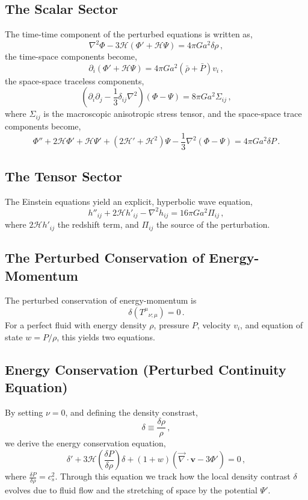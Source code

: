 \documentclass{book}
\begin{document}
	\subsection*{The Scalar Sector}
	The time-time component of the perturbed equations is written as,
	\begin{equation}
		\label{time-time_component_perturbation}
		\nabla^2 \Phi - 3 \mathcal{H}(\Phi ' +\mathcal{H}\Psi)=4\pi Ga^2\delta \rho \, ,
	\end{equation}
	the time-space components become,
	\begin{equation}
		\partial_i (\Phi'+\mathcal{H}\Psi)=4\pi Ga^2 (\bar\rho+\bar P)v_i \, ,
	\end{equation}
	the space-space traceless components,
	\begin{equation}
		\left( \partial_i \partial_j -\frac13 \delta_{ij}\nabla^2 \right)(\Phi-\Psi)=8\pi Ga^2\Sigma_{ij} \, ,
	\end{equation}
	where $\Sigma_{ij}$ is the macroscopic anisotropic stress tensor, and the space-space trace components become,
	\begin{equation}
		\Phi '' +2\mathcal{H} \Phi'+\mathcal{H} \Psi' + (2\mathcal{H}'+\mathcal{H}^2)\Psi -\frac13 \nabla^2 (\Phi-\Psi)=4\pi Ga^2 \delta P \, .
	\end{equation}
	\subsection*{The Tensor Sector}
	The Einstein equations yield an explicit, hyperbolic wave equation,
	\begin{equation}
		h''_{ij}+2\mathcal{H}h'_{ij}-\nabla^2h_{ij}=16\pi Ga^2 \Pi_{ij} \, ,
	\end{equation}
	where $2\mathcal{H}h'_{ij}$ the redshift term, and $\Pi_{ij}$ the source of the perturbation.
	\subsection{The Perturbed Conservation of Energy-Momentum}
	The perturbed conservation of energy-momentum is
	\begin{equation}
		\delta\left( {T^\mu}_{\nu;\mu} \right) =0 \, .
	\end{equation}
	For a perfect fluid with energy density $\rho$, pressure $P$, velocity $v_i$, and equation of state $w=P/\rho$, this yields two equations.
	\subsection*{Energy Conservation (Perturbed Continuity Equation)}
	By setting $\nu=0$, and defining the density constrast,
	\begin{equation}
		\delta\equiv\frac{\delta\rho}{\rho}\, ,
	\end{equation}
	we derive the energy conservation equation,
	\begin{equation}
		\delta'+3\mathcal{H} \left( \frac{\delta P}{\delta \rho} \right) \delta + (1+w)(\vec\nabla\cdot \mathbf{v}-3\Phi') =0 \, ,
	\end{equation}
	where $\frac{\delta P}{\delta\rho}=c^2_s$. Through this equation we track how the local density contrast $\delta$ evolves due to fluid flow and the stretching of space by the potential $\Psi'$. 
\end{document}
